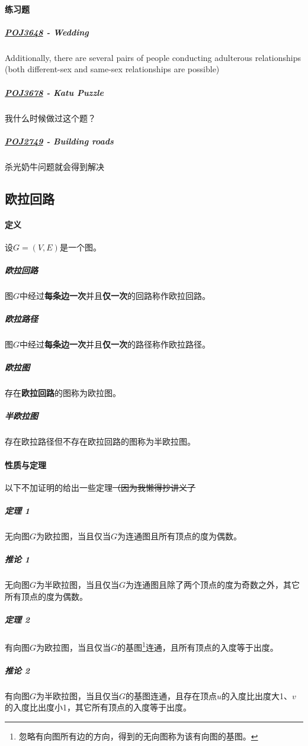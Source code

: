 \documentclass[]{cpp}
\begin{document}
\paragraph{练习题}
\subparagraph{\href{http://poj.org/problem?id=3648}{POJ3648} - Wedding}
Additionally, there are several pairs of people conducting adulterous relationships (both different-sex and same-sex relationships are possible)
\subparagraph{\href{http://poj.org/problem?id=3678}{POJ3678} - Katu Puzzle} 我什么时候做过这个题？
\subparagraph{\href{http://poj.org/problem?id=2749}{POJ2749} - Building roads} 杀光奶牛问题就会得到解决
\subsection{欧拉回路}
\paragraph{定义}
	设$G=(V,E)$是一个图。
\subparagraph{欧拉回路} 图$G$中经过\textbf{每条边一次}并且\textbf{仅一次}的回路称作欧拉回路。
\subparagraph{欧拉路径} 图$G$中经过\textbf{每条边一次}并且\textbf{仅一次}的路径称作欧拉路径。
\subparagraph{欧拉图}   存在\textbf{欧拉回路}的图称为欧拉图。
\subparagraph{半欧拉图} 存在欧拉路径但不存在欧拉回路的图称为半欧拉图。
\paragraph{性质与定理}
	以下不加证明的给出一些定理\quad\sout{（因为我懒得抄讲义了}
\subparagraph{定理 1} 无向图$G$为欧拉图，当且仅当$G$为连通图且所有顶点的度为偶数。
\subparagraph{推论 1} 无向图$G$为半欧拉图，当且仅当$G$为连通图且除了两个顶点的度为奇数之外，其它所有顶点的度为偶数。
\subparagraph{定理 2} 有向图$G$为欧拉图，当且仅当$G$的基图\footnote{忽略有向图所有边的方向，得到的无向图称为该有向图的基图。}连通，且所有顶点的入度等于出度。
\subparagraph{推论 2} 有向图$G$为半欧拉图，当且仅当$G$的基图连通，且存在顶点$u$的入度比出度大1、$v$的入度比出度小1，其它所有顶点的入度等于出度。
\end{document}
